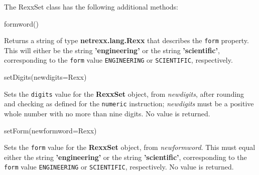 The RexxSet class has the following additional methods:
\begin{description}
\item{formword()}

Returns a string of type \textbf{netrexx.lang.Rexx} that describes the
\texttt{form} property.  This will either be the string \textbf{'engineering'}
or the string \textbf{'scientific'}, corresponding to the \texttt{form}
value \texttt{ENGINEERING} or \texttt{SCIENTIFIC}, respectively.
\item{setDigits(newdigits=Rexx)}

Sets the \texttt{digits} value for the \textbf{RexxSet} object, from
\emph{newdigits}, after rounding and checking as defined for the
\texttt{numeric} instruction; \emph{newdigits} must be a positive
whole number with no more than nine digits.
No value is returned.
\item{setForm(newformword=Rexx)}

Sets the \texttt{form} value for the \textbf{RexxSet} object, from
\emph{newformword}.
This must equal either the string \textbf{'engineering'} or the
string \textbf{'scientific'}, corresponding to the \texttt{form}
value \texttt{ENGINEERING} or \texttt{SCIENTIFIC}, respectively.
No value is returned.
\end{description}
